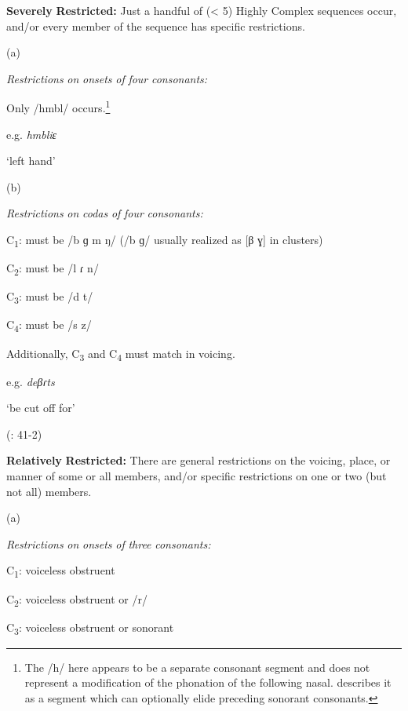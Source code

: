\ea\label{ex:(3.27)}
  \textbf{Severely} \textbf{Restricted:} Just a handful of (< 5) Highly Complex sequences occur, and/or every member of the sequence has specific restrictions.

(a)

\textit{Restrictions} \textit{on} \textit{onsets} \textit{of} \textit{four} \textit{consonants:}

Only /hmbl/ occurs.\footnote{ \textrm{The /h/ here appears to be a separate consonant segment and does not represent a modification of the phonation of the following nasal. \citet[54]{Marmion2010} describes it as a segment which can optionally elide preceding sonorant consonants.}}

e.g.  \textit{hmbliɛ}

    ‘left hand’

\citep[69]{Marmion2010}

(b)

\textit{Restrictions} \textit{on} \textit{codas} \textit{of} \textit{four} \textit{consonants:}

C\textsubscript{1}: must be /b ɡ m ŋ/ (/b ɡ/ usually realized as [β ɣ] in clusters)

C\textsubscript{2}: must be /l ɾ n/

C\textsubscript{3}: must be /d t/

C\textsubscript{4}: must be /s z/

\z

Additionally, C\textsubscript{3} and C\textsubscript{4} must match in voicing.

e.g.   \textit{deβɾts}

    ‘be cut off for’

(\citealt{WieringWiering1995}: 41-2)

\ea\label{ex:(3.28)}
  \textbf{Relatively} \textbf{Restricted:} There are general restrictions on the voicing, place, or manner of some or all members, and/or specific restrictions on one or two (but not all) members.

(a)

\textit{Restrictions} \textit{on} \textit{onsets} \textit{of} \textit{three} \textit{consonants:}

C\textsubscript{1}: voiceless obstruent

C\textsubscript{2}: voiceless obstruent or /r/

C\textsubscript{3}: voiceless obstruent or sonorant

